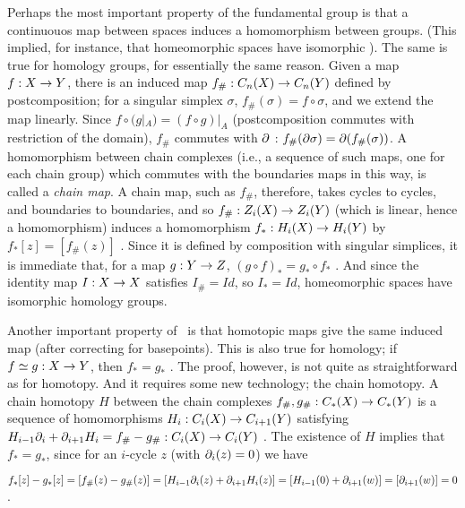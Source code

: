\bsk


Perhaps the most important property of the fundamental group is that a continuouos map 
between spaces induces a homomorphism between groups. (This implied, for instance,
that homeomorphic spaces have isomorphic \mpu ). The same is true for homology groups, 
for essentially the same reason. Given a map $f:X\rightarrow Y$, there is an induced map $f_\#:C_n(X)\rightarrow C_n(Y)$
defined by postcomposition; for a singular simplex $\sigma$, $f_\#(\sigma) = f\circ\sigma$, and we extend
the map linearly. Since $f\circ(g|_A) = (f\circ g)|_A$ (postcomposition commutes with restriction of the domain),
$f_\#$ commutes with $\partial$ : $f_\#(\partial \sigma) = \partial(f_\#(\sigma))$. A homomorphism between
chain complexes (i.e., a sequence of such maps, one for each chain group) which commutes with the 
boundaries maps in this way, is called a {\it chain map}.
A chain map, such as $f_\#$, therefore, takes cycles to cycles,
and boundaries to boundaries, and so $f_\#:Z_i(X)\rightarrow Z_i(Y)$ (which is linear, hence a homomorphism)
induces a homomorphism $f_*:H_i(X)\rightarrow H_i(Y)$ by $f_*[z] = [f_\#(z)]$ . 
Since it is defined by composition with singular simplices, it is 
immediate that, for a map $g:Y\rightarrow Z$, $(g\circ f)_*=g_*\circ f_*$ . And since the identity map $I:X\rightarrow X$
satisfies $I_\#=Id$, so $I_*=Id$, homeomorphic spaces have isomorphic homology groups.

\msk

Another important property of \mpu\ is that homotopic maps give the same
induced map (after correcting for basepoints). This is also true for homology;
if $f\simeq g:X\rightarrow Y$, then $f_*=g_*$ . The proof, however, is not quite as straightforward
as for homotopy. And it requires some new technology; the chain homotopy.
A chain homotopy $H$ between the chain complexes $f_\#,g_\#:C_*(X)\rightarrow C_*(Y)$ 
is a sequence of homomorphisms $H_i:C_i(X)\rightarrow C_{i+1}(Y)$ satisfying
$H_{i-1}\partial_i+\partial_{i+1}H_i = f_\#-g_\#:C_i(X)\rightarrow C_i(Y)$ . The existence of $H$
implies that $f_*=g_*$, since for an $i$-cycle $z$ (with $\partial_i(z)=0$) we have

$f_*[z]-g_*[z] = [f_\#(z)-g_\#(z)] = [H_{i-1}\partial_i(z)+\partial_{i+1}H_i(z)] = [H_{i-1}(0)+\partial_{i+1}(w)]
=[\partial_{i+1}(w)]=0$.


